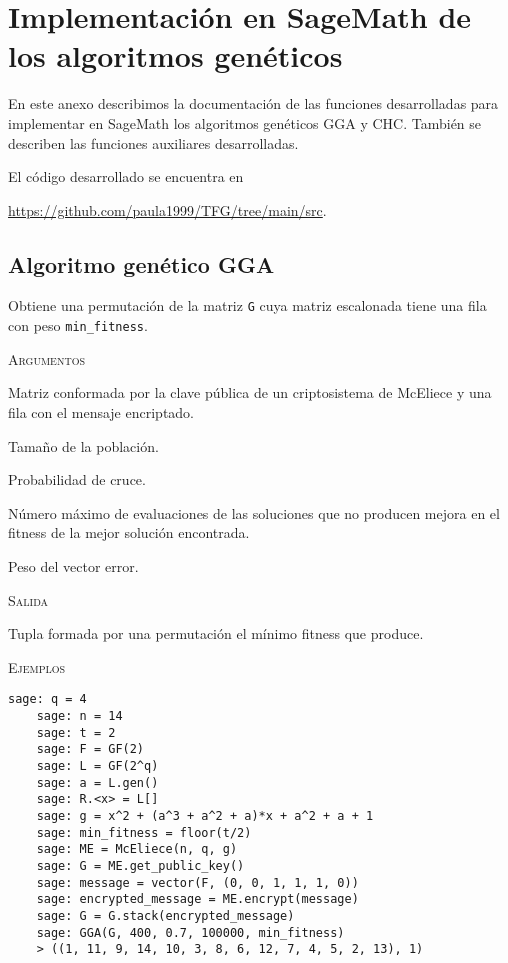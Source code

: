 \chapter[Implementación en SageMath de los algoritmos genéticos]{Implementación en SageMath de los algoritmos genéticos}
\label{annex:sage-geneticos}

En este anexo describimos la documentación de las funciones desarrolladas para implementar en SageMath los algoritmos genéticos GGA y CHC. También se describen las funciones auxiliares desarrolladas. 

El código desarrollado se encuentra en
\begin{center}
\url{https://github.com/paula1999/TFG/tree/main/src}.
\end{center}

\section{Algoritmo genético GGA}

\begin{description}[leftmargin=1em, font=\normalfont\ttfamily, style=nextline]
  \item[GGA(G, N, pc, max\_reinit, min\_fitness)] Obtiene una permutación de la matriz \texttt{G} cuya matriz escalonada tiene una fila con peso \texttt{min\_fitness}.

  \textsc{Argumentos}
  \begin{description}[font=\normalfont\ttfamily]
    \item[G] Matriz conformada por la clave pública de un criptosistema de McEliece y una fila con el mensaje encriptado.
    \item[N] Tamaño de la población.
    \item[pc] Probabilidad de cruce.
    \item[max\_reinit] Número máximo de evaluaciones de las soluciones que no producen mejora en el fitness de la mejor solución encontrada.
    \item[min\_fitness] Peso del vector error. 
  \end{description}

  \textsc{Salida}
  \begin{description}[font=\normalfont\ttfamily]
    \item[] Tupla formada por una permutación el mínimo fitness que produce.
  \end{description}

  \textsc{Ejemplos}
  \begin{lstlisting}[gobble=4]
    sage: q = 4
    sage: n = 14
    sage: t = 2
    sage: F = GF(2)
    sage: L = GF(2^q)
    sage: a = L.gen()
    sage: R.<x> = L[]
    sage: g = x^2 + (a^3 + a^2 + a)*x + a^2 + a + 1
    sage: min_fitness = floor(t/2)
    sage: ME = McEliece(n, q, g)
    sage: G = ME.get_public_key()
    sage: message = vector(F, (0, 0, 1, 1, 1, 0))
    sage: encrypted_message = ME.encrypt(message)
    sage: G = G.stack(encrypted_message)
    sage: GGA(G, 400, 0.7, 100000, min_fitness)
    > ((1, 11, 9, 14, 10, 3, 8, 6, 12, 7, 4, 5, 2, 13), 1)
  \end{lstlisting}
\end{description}

